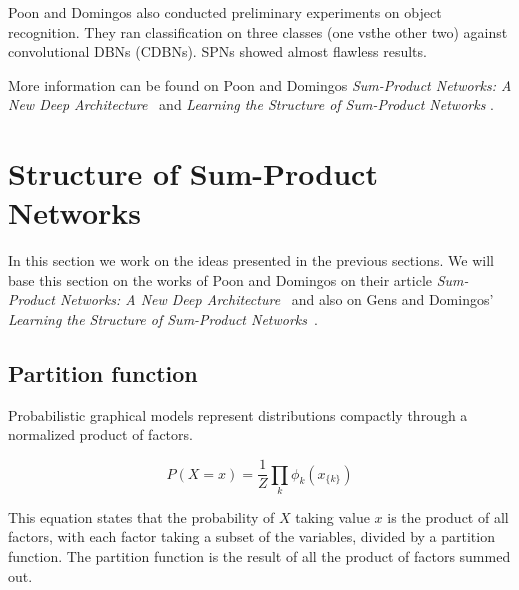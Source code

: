 \documentclass[a4paper,10pt]{article}
\theoremstyle{plain}
\begin{document}
Poon and Domingos also conducted preliminary experiments on object recognition. They ran
classification on three classes (one vs\. the other two) against convolutional DBNs (CDBNs). SPNs
showed almost flawless results.

\begin{table}[h]
\end{table}

More information can be found on Poon and Domingos \textit{Sum-Product Networks: A New Deep
Architecture}~\cite{poon-domingos} and \textit{Learning the Structure of Sum-Product Networks}
\cite{gens-domingos}.

\newpage

\section{Structure of Sum-Product Networks}

In this section we work on the ideas presented in the previous sections. We will base this section
on the works of Poon and Domingos on their article \textit{Sum-Product Networks: A New Deep
Architecture}~\cite{poon-domingos} and also on Gens and Domingos' \textit{Learning the Structure of
Sum-Product Networks}~\cite{gens-domingos}.

\subsection{Partition function}

Probabilistic graphical models represent distributions compactly through a normalized product of
factors.

\begin{equation*}
  P(X=x) = \frac{1}{Z}\prod_k \phi_k (x_{\{k\}})
\end{equation*}

This equation states that the probability of $X$ taking value $x$ is the product of all factors,
with each factor taking a subset of the variables, divided by a partition function. The partition
function is the result of all the product of factors summed out.
\end{document}
